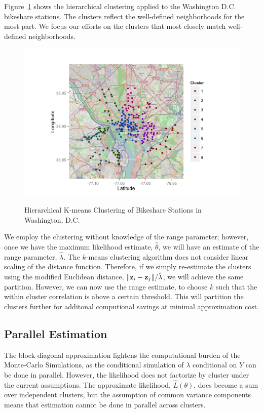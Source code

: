 \documentclass{acm_proc_article-sp}
\begin{document}
Figure~\ref{fig:cluster_map} shows the hierarchical clustering applied to the Washington D.C. bikeshare stations.  The clusters reflect the well-defined neighborhoods for the most part. We focus our efforts on the clusters that most closely match well-defined neighborhoods.

\begin{figure} [!h]
\caption{Hierarchical K-means Clustering of Bikeshare Stations in Washington, D.C.}
\centering
\includegraphics[scale = 0.5]{cluster_map.png}
\label{fig:cluster_map}
\end{figure}

We employ the clustering without knowledge of the range parameter; however, once we have the maximum likelihood estimate, $\hat{\theta}$, we will have an estimate of the range parameter, $\hat{\lambda}$.  The $k$-means clustering algorithm does not consider linear scaling of the distance function.  Therefore, if we simply re-estimate the clusters using the modified Euclidean distance, $\|{\bf z}_i - {\bf z}_j \| / \hat{\lambda}$, we will achieve the same partition.  However, we can now use the range estimate, to choose $k$ such that the within cluster correlation is above a certain threshold.  This will partition the clusters further for additonal computional savings at minimal approximation cost. 

\subsection{Parallel Estimation}

The block-diagonal approximation lightens the computational burden of the Monte-Carlo Simulations, as the conditional simulation of $\lambda$ conditional on $Y$ can be done in parallel.  However, the likelihood does not factorize by cluster under the current assumptions.  The approximate likelihood, $\hat{L} (\theta)$, does become a sum over independent clusters, but the assumption of common variance components means that estimation cannot be done in parallel across clusters.
\end{document}

